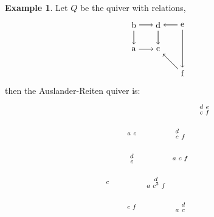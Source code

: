 \documentclass[11.5pt, twoside, a4paper, titlepage]{report}
\theoremstyle{definition}
\newtheorem{eg}[mydef]{Example}
\theoremstyle{plain}
\begin{document}
\begin{eg}
Let $Q$ be the quiver with relations, 
\begin{equation*}
\begin{tikzpicture}[->,-latex, auto, m path/.style={->, semithick}, every node/.style={}]
\node				(b) at (0,0)		{b};
\node 				(a) at (0,-1)		{a};
\node 				(d) at (1,0)		{d};
\node 				(c) at (1,-1)		{c};
\node 				(e) at (2,0)		{e};
\node 				(f) at (2,-2)		{f};



\draw (b) [m path] edge (a);
\draw (b) [m path] edge (d);
\draw (d) [m path] edge (c);
\draw (a) [m path] edge (c);
\draw (e) [m path] edge (d);
\draw (f) [m path] edge (c);
\draw (e) [m path] edge (f);
\end{tikzpicture}
\end{equation*}
then the Auslander-Reiten quiver is:
\begin{equation*}
\begin{tikzpicture}[->,-latex, auto, main path/.style={->, semithick}, t path/.style={->, dashed, semithick}, every node/.style={}]
\node			(c) at (0,0)		{$\begin{smallmatrix}c\end{smallmatrix}$};
\node 			(ac) at (1,2)		{$\begin{smallmatrix}a&c\end{smallmatrix}$};
\node 			(dc) at (1,1)		{$\begin{smallmatrix} d\\c \end{smallmatrix}$};
\node			(cf) at (1,-1)		{$\begin{smallmatrix}c & f\end{smallmatrix}$};
\node 			(dac2f) at (2,0)	{$\begin{smallmatrix}& d & \\ a & c^2 & f\end{smallmatrix}$};
\node 			(dcf) at (3,2)		{$\begin{smallmatrix} d& \\ c&f\end{smallmatrix}$};
\node			(acf) at (3,1)		{$\begin{smallmatrix}a & c & f\end{smallmatrix}$};
\node 			(dac) at (3,-1)	{$\begin{smallmatrix} & d \\ a&c\end{smallmatrix}$};
\node 			(decf) at (4,3)		{$\begin{smallmatrix}  d & e \\ c & f\end{smallmatrix}$};

\end{tikzpicture}
\end{equation*}
\end{eg}
\end{document}
